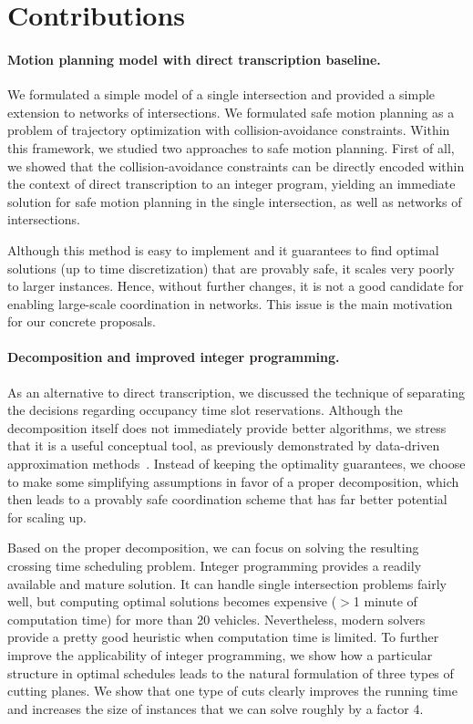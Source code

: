 \documentclass[a4paper]{report}
\theoremstyle{definition}
\theoremstyle{plain}
\begin{document}
\section{Contributions}

\paragraph{Motion planning model with direct transcription baseline.}
We formulated a simple model of a single intersection and provided a simple
extension to networks of intersections.
%
We formulated safe motion planning as a problem of trajectory optimization with
collision-avoidance constraints.
Within this framework, we studied two approaches to safe motion planning.
%
First of all, we showed that the collision-avoidance constraints can be directly
encoded within the context of direct transcription to an integer program,
yielding an immediate solution for safe motion planning in the single
intersection, as well as networks of intersections.

Although this method is easy to implement and it guarantees to find optimal
solutions (up to time discretization) that are provably safe, it scales very
poorly to larger instances.
%
Hence, without further changes, it is not a good candidate for enabling
large-scale coordination in networks.
%
This issue is the main motivation for our concrete proposals.

\paragraph{Decomposition and improved integer programming.}
As an alternative to direct transcription, we discussed the technique of
separating the decisions regarding occupancy time slot reservations.
%
Although the decomposition itself does not immediately provide better
algorithms, we stress that it is a useful conceptual tool, as previously
demonstrated by data-driven approximation
methods~\cite{hultApproximateSolutionOptimal2015,hultTechnicalReportApproximate}.
Instead of keeping the optimality guarantees, we choose to make some simplifying
assumptions in favor of a proper decomposition, which then leads to a provably
safe coordination scheme that has far better potential for scaling up.

Based on the proper decomposition, we can focus on solving the resulting
crossing time scheduling problem. Integer programming provides a readily
available and mature solution.
%
It can handle single intersection problems fairly well, but computing optimal
solutions becomes expensive ($>$1 minute of computation time) for more than 20
vehicles.
%
Nevertheless, modern solvers provide a pretty good heuristic when computation
time is limited.
To further improve the applicability of integer programming, we show how a
particular structure in optimal schedules leads to the natural formulation of
three types of cutting planes.
%
We show that one type of cuts clearly improves the running time and increases
the size of instances that we can solve roughly by a factor 4.
\end{document}
